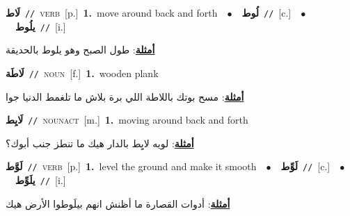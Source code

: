 \documentclass[10pt,a4paper,twoside]{article} %
\begin{document}
\begin{multicols}{2}
{\setlength\topsep{0pt}\textbf{\foreignlanguage{arabic}{لَاط}}\ {\color{gray}\texttt{//}\color{black}}\ \textsc{verb}\ [p.]\ \textbf{1.}~move around back and forth\ \ $\bullet$\ \ \setlength\topsep{0pt}\textbf{\foreignlanguage{arabic}{لُوط}}\ {\color{gray}\texttt{//}\color{black}}\ [c.]\ \ $\bullet$\ \ \setlength\topsep{0pt}\textbf{\foreignlanguage{arabic}{يلُوط}}\ {\color{gray}\texttt{//}\color{black}}\ [i.]\  \begin{flushright}\color{gray}\foreignlanguage{arabic}{\textbf{\underline{\foreignlanguage{arabic}{أمثلة}}}: طول الصبح وهو يلوط بالحديقة}\end{flushright}\color{black}} \vspace{2mm}

{\setlength\topsep{0pt}\textbf{\foreignlanguage{arabic}{لَاطَة}}\ {\color{gray}\texttt{//}\color{black}}\ \textsc{noun}\ [f.]\ \textbf{1.}~wooden plank\  \begin{flushright}\color{gray}\foreignlanguage{arabic}{\textbf{\underline{\foreignlanguage{arabic}{أمثلة}}}: مسح بوتك باللاطة اللي برة بلاش ما تلغمط الدنيا جوا}\end{flushright}\color{black}} \vspace{2mm}

{\setlength\topsep{0pt}\textbf{\foreignlanguage{arabic}{لَايِط}}\ {\color{gray}\texttt{//}\color{black}}\ \textsc{noun\textunderscore act}\ [m.]\ \textbf{1.}~moving around back and forth\  \begin{flushright}\color{gray}\foreignlanguage{arabic}{\textbf{\underline{\foreignlanguage{arabic}{أمثلة}}}: لويه لايِِط بالدار هيك ما تنطز جنب أبوك؟}\end{flushright}\color{black}} \vspace{2mm}

{\setlength\topsep{0pt}\textbf{\foreignlanguage{arabic}{لَوَّط}}\ {\color{gray}\texttt{//}\color{black}}\ \textsc{verb}\ [p.]\ \textbf{1.}~level the ground and make it smooth\ \ $\bullet$\ \ \setlength\topsep{0pt}\textbf{\foreignlanguage{arabic}{لَوِّط}}\ {\color{gray}\texttt{//}\color{black}}\ [c.]\ \ $\bullet$\ \ \setlength\topsep{0pt}\textbf{\foreignlanguage{arabic}{يلَوِّط}}\ {\color{gray}\texttt{//}\color{black}}\ [i.]\  \begin{flushright}\color{gray}\foreignlanguage{arabic}{\textbf{\underline{\foreignlanguage{arabic}{أمثلة}}}: أدوات القصارة ما أظنش انهم بيلَوطوا الأرض هيك}\end{flushright}\color{black}} \vspace{2mm}


\end{multicols}
\end{document}
